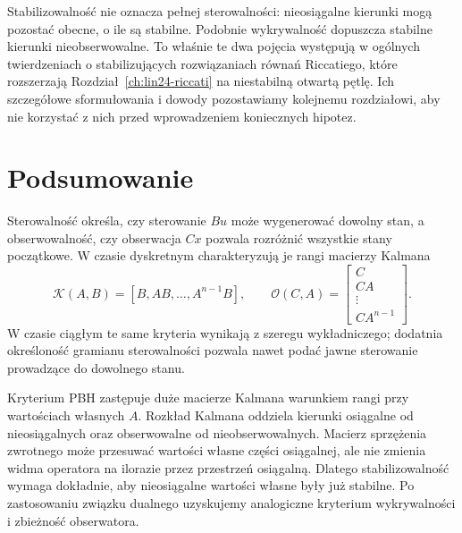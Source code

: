 \begin{uwaga}
\label{rem:lin25-riccati}
Stabilizowalność nie oznacza
pełnej sterowalności:
nieosiągalne kierunki
mogą pozostać obecne,
o ile są stabilne.
Podobnie wykrywalność
dopuszcza stabilne kierunki
nieobserwowalne.
To właśnie te dwa
pojęcia występują
w ogólnych twierdzeniach
o stabilizujących rozwiązaniach
równań Riccatiego,
które rozszerzają
Rozdział~\ref{ch:lin24-riccati}
na niestabilną otwartą pętlę.
Ich szczegółowe sformułowania
i dowody pozostawiamy
kolejnemu rozdziałowi,
aby nie korzystać z nich
przed wprowadzeniem
koniecznych hipotez.
\end{uwaga}

\section{Podsumowanie}
\label{sec:lin25-summary}

Sterowalność określa,
czy sterowanie \(Bu\)
może wygenerować dowolny stan,
a obserwowalność, czy
obserwacja \(Cx\)
pozwala rozróżnić
wszystkie stany początkowe.
W czasie dyskretnym
charakteryzują je rangi
macierzy Kalmana
\[
 \mathcal K(A,B)=
 [B,AB,\ldots,A^{n-1}B],
 \qquad
 \mathcal O(C,A)=
 \begin{bmatrix}
 C\\CA\\\vdots\\CA^{n-1}
 \end{bmatrix}.
\]
W czasie ciągłym
te same kryteria wynikają
z szeregu wykładniczego;
dodatnia określoność
gramianu sterowalności
pozwala nawet podać
jawne sterowanie prowadzące
do dowolnego stanu.

Kryterium PBH zastępuje
duże macierze Kalmana
warunkiem rangi przy
wartościach własnych \(A\).
Rozkład Kalmana oddziela
kierunki osiągalne
od nieosiągalnych oraz
obserwowalne od nieobserwowalnych.
Macierz sprzężenia zwrotnego
może przesuwać wartości własne
części osiągalnej,
ale nie zmienia widma operatora
na ilorazie przez
przestrzeń osiągalną.
Dlatego stabilizowalność
wymaga dokładnie,
aby nieosiągalne wartości własne
były już stabilne.
Po zastosowaniu
związku dualnego
uzyskujemy analogiczne
kryterium wykrywalności
i zbieżność obserwatora.
